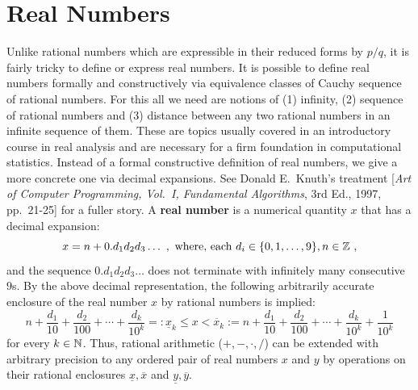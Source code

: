 \section{Real Numbers}\label{S:Reals}
Unlike rational numbers which are expressible in their reduced forms by $p/q$, it is fairly tricky to define or express real numbers.  It is possible to define real numbers formally and constructively via equivalence classes of Cauchy sequence of rational numbers.  For this all we need are notions of (1) infinity, (2) sequence of rational numbers and (3) distance between any two rational numbers in an infinite sequence of them.  These are topics usually covered in an introductory course in real analysis and are necessary for a firm  foundation in computational statistics.  Instead of a formal constructive definition of real numbers, we give a more concrete one via decimal expansions.  See Donald E.~Knuth's treatment [{\em Art of Computer Programming, Vol.~I, Fundamental Algorithms}, 3rd Ed., 1997, pp.~21-25] for a fuller story.  A {\bf real number} is a numerical quantity $x$ that has a decimal expansion:
\[
x = n+ 0.d_1d_2d_3 \ldots \ , \text{ where, each } d_i \in \{0,1,\ldots,9\}, n \in \mathbb{Z} \ ,
\]
and the sequence $ 0.d_1d_2d_3 \ldots$ does not terminate with infinitely many consecutive $9$s.  By the above decimal representation, the following arbitrarily accurate enclosure of the real number $x$ by rational numbers is implied:
\[
n+\frac{d_1}{10}+\frac{d_2}{100}+\cdots+\frac{d_k}{10^k} =: \underline{x}_k \leq x < \overline{x}_k := 
n+\frac{d_1}{10}+\frac{d_2}{100}+\cdots+\frac{d_k}{10^k}+\frac{1}{10^k}
\]
for every $k \in \mathbb{N}$.  Thus, rational arithmetic ($+,-,\cdot,/$) can be extended with arbitrary precision to any ordered pair of real numbers $x$ and $y$ by operations on their rational enclosures $\underline{x}, \overline{x}$ and $\underline{y}, \overline{y}$. 

